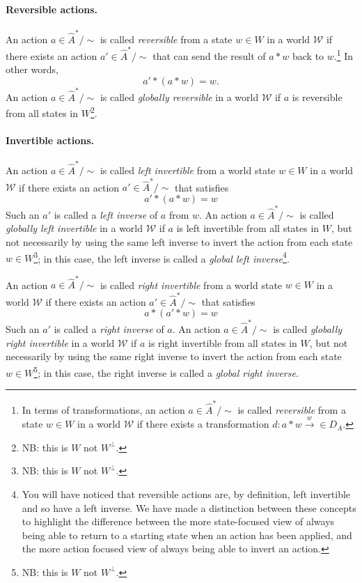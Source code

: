 \paragraph{Reversible actions.}
An action $a \in \hat{A}^{*}/\sim$ is called \emph{reversible} from a state $w \in W$ in a world $\mathscr{W}$ if there exists an action $a' \in \hat{A}^{*}/\sim$ that can send the result of $a \ast w$ back to $w$.\footnote{
In terms of transformations, an action $a \in \hat{A}^{*}/\sim$ is called \emph{reversible} from a state $w \in W$ in a world $\mathscr{W}$ if there exists a transformation $d: a * w \xrightarrow w \in D_{A}$.
}
In other words,
\begin{equation}
    a' * (a * w) = w.
\end{equation}
An action $a \in \hat{A}^{*}/\sim$ is called \emph{globally reversible} in a world $\mathscr{W}$ if $a$ is reversible from all states in $W$\footnote{
NB: this is $W$ not $W^{\bot}$.
}.

\paragraph{Invertible actions.}
An action $a \in \hat{A}^{*}/\sim$ is called \emph{left invertible} from a world state $w \in W$ in a world $\mathscr{W}$ if there exists an action $a' \in \hat{A}^{*}/\sim$ that satisfies
\begin{equation}
    a' * (a * w) = w
\end{equation}
Such an $a'$ is called a \emph{left inverse} of $a$ from $w$.
An action $a \in \hat{A}^{*}/\sim$ is called \emph{globally left invertible} in a world $\mathscr{W}$ if $a$ is left invertible from all states in $W$, but not necessarily by using the same left inverse to invert the action from each state $w \in W$\footnote{
NB: this is $W$ not $W^{\bot}$.
}; in this case, the left inverse is called a \emph{global left inverse}\footnote{
You will have noticed that reversible actions are, by definition, left invertible and so have a left inverse.
We have made a distinction between these concepts to highlight the difference between the more state-focused view of always being able to return to a starting state when an action has been applied, and the more action focused view of always being able to invert an action.
}.

An action $a \in \hat{A}^{*}/\sim$ is called \emph{right invertible} from a world state $w \in W$ in a world $\mathscr{W}$ if there exists an action $a' \in \hat{A}^{*}/\sim$ that satisfies
\begin{equation}
    a * (a' * w) = w
\end{equation}
Such an $a'$ is called a \emph{right inverse} of $a$.
An action $a \in \hat{A}^{*}/\sim$ is called \emph{globally right invertible} in a world $\mathscr{W}$ if $a$ is right invertible from all states in $W$, but not necessarily by using the same right inverse to invert the action from each state $w \in W$\footnote{
NB: this is $W$ not $W^{\bot}$.
}; in this case, the right inverse is called a \emph{global right inverse}.

